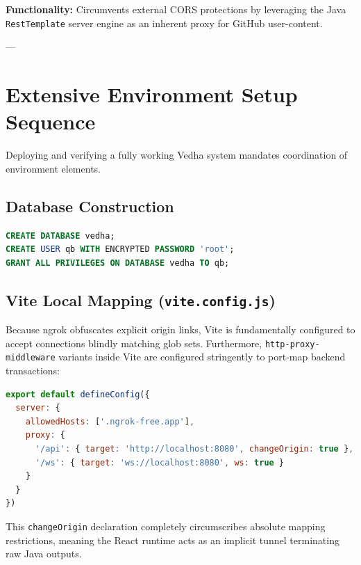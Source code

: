 \documentclass[12pt,a4paper]{article}
\begin{document}
\begin{tcolorbox}[colback=white,colframe=cerulean,title=\texttt{GET /api/snippets/github?url=\dots}]
\textbf{Functionality:} Circumvents external CORS protections by leveraging the Java \texttt{RestTemplate} server engine as an inherent proxy for GitHub user-content.
\end{tcolorbox}

---

\section{Extensive Environment Setup Sequence}
Deploying and verifying a fully working Vedha system mandates coordination of environment elements.

\subsection{Database Construction}
\begin{lstlisting}[language=SQL]
CREATE DATABASE vedha;
CREATE USER qb WITH ENCRYPTED PASSWORD 'root';
GRANT ALL PRIVILEGES ON DATABASE vedha TO qb;
\end{lstlisting}

\subsection{Vite Local Mapping (\texttt{vite.config.js})}
Because ngrok obfuscates explicit origin links, Vite is fundamentally configured to accept connections blindly matching glob sets. Furthermore, \texttt{http-proxy-middleware} variants inside Vite are configured stringently to port-map backend transactions:
\begin{lstlisting}[language=javascript]
export default defineConfig({
  server: {
    allowedHosts: ['.ngrok-free.app'],
    proxy: {
      '/api': { target: 'http://localhost:8080', changeOrigin: true },
      '/ws': { target: 'ws://localhost:8080', ws: true }
    }
  }
})
\end{lstlisting}
This \texttt{changeOrigin} declaration completely circumscribes absolute mapping restrictions, meaning the React runtime acts as an implicit tunnel terminating raw Java outputs.
\end{document}
